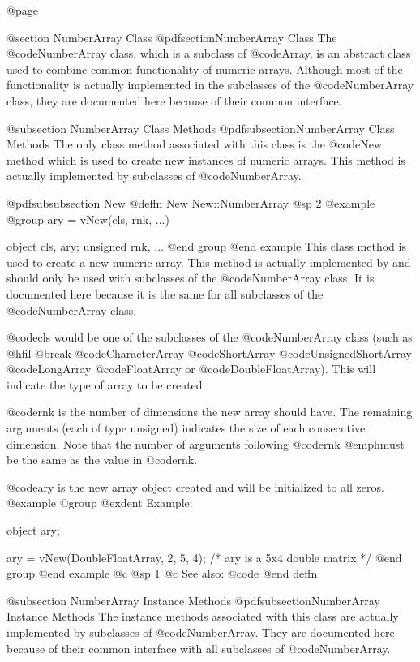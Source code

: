 @page

@section NumberArray Class
@pdfsection{NumberArray Class}
The @code{NumberArray} class, which is a subclass of @code{Array}, is an
abstract class used to combine common functionality of numeric arrays.
Although most of the functionality is actually implemented in the
subclasses of the @code{NumberArray} class, they are documented here
because of their common interface.


@subsection NumberArray Class Methods
@pdfsubsection{NumberArray Class Methods}
The only class method associated with this class is the @code{New} method
which is used to create new instances of numeric arrays.  This method
is actually implemented by subclasses of @code{NumberArray}.








@pdfsubsubsection {New}
@deffn {New} New::NumberArray
@sp 2
@example
@group
ary = vNew(cls, rnk, ...)

object    cls, ary;
unsigned  rnk, ...
@end group
@end example
This class method is used to create a new numeric array.  This method
is actually implemented by and should only be used with subclasses of
the @code{NumberArray} class.  It is documented here because it is the
same for all subclasses of the @code{NumberArray} class.

@code{cls} would be one of the subclasses of the @code{NumberArray}
class (such as @hfil @break @code{CharacterArray} @code{ShortArray}
@code{UnsignedShortArray} @code{LongArray} @code{FloatArray} or
@code{DoubleFloatArray}).  This will indicate the type of array to be
created.

@code{rnk} is the number of dimensions the new array should have.
The remaining arguments (each of type unsigned) indicates the size of
each consecutive dimension.  Note that the number of arguments following
@code{rnk} @emph{must} be the same as the value in @code{rnk}.

@code{ary} is the new array object created and will be initialized to all
zeros.
@example
@group
@exdent Example:

object  ary;

ary = vNew(DoubleFloatArray, 2, 5, 4);
/*  ary is a 5x4 double matrix  */
@end group
@end example
@c @sp 1
@c See also:  @code{}
@end deffn






@subsection NumberArray Instance Methods
@pdfsubsection{NumberArray Instance Methods}
The instance methods associated with this class are actually implemented
by subclasses of @code{NumberArray}.  They are documented here because
of their common interface with all subclasses of @code{NumberArray}.

